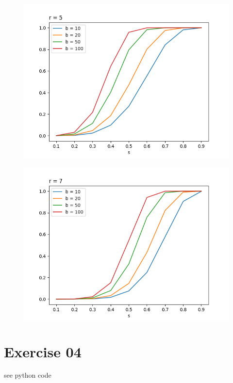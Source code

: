 \documentclass[11pt,a4paper]{scrartcl}
\begin{document}
\begin{figure}
\centering
\begin{minipage}{.5\textwidth}
  \centering
  \includegraphics[width=.99\linewidth]{q3r5}
  \label{fig:r5}
\end{minipage}%
\begin{minipage}{.5\textwidth}
  \centering
  \includegraphics[width=.99\linewidth]{q3r7}
  \label{fig:r7}
\end{minipage}
\end{figure}

\section*{Exercise 04}
see python code
\end{document}
